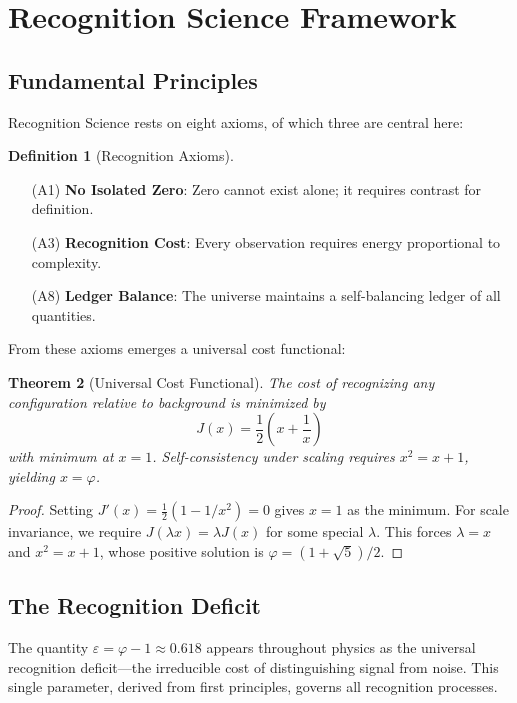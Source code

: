 \documentclass[11pt]{article}
\theoremstyle{plain}
\newtheorem{theorem}{Theorem}[section]
\theoremstyle{definition}
\newtheorem{definition}[theorem]{Definition}
\theoremstyle{remark}
\begin{document}
\section{Recognition Science Framework}

\subsection{Fundamental Principles}

Recognition Science rests on eight axioms, of which three are central here:

\begin{definition}[Recognition Axioms]
\begin{enumerate}
\item[(A1)] \textbf{No Isolated Zero}: Zero cannot exist alone; it requires contrast for definition.
\item[(A3)] \textbf{Recognition Cost}: Every observation requires energy proportional to complexity.
\item[(A8)] \textbf{Ledger Balance}: The universe maintains a self-balancing ledger of all quantities.
\end{enumerate}
\end{definition}

From these axioms emerges a universal cost functional:

\begin{theorem}[Universal Cost Functional]
The cost of recognizing any configuration relative to background is minimized by
\[
J(x) = \frac{1}{2}\left(x + \frac{1}{x}\right)
\]
with minimum at $x = 1$. Self-consistency under scaling requires $x^2 = x + 1$, yielding $x = \varphi$.
\end{theorem}

\begin{proof}
Setting $J'(x) = \frac{1}{2}(1 - 1/x^2) = 0$ gives $x = 1$ as the minimum. For scale invariance, we require $J(\lambda x) = \lambda J(x)$ for some special $\lambda$. This forces $\lambda = x$ and $x^2 = x + 1$, whose positive solution is $\varphi = (1+\sqrt{5})/2$.
\end{proof}

\subsection{The Recognition Deficit}

The quantity $\varepsilon = \varphi - 1 \approx 0.618$ appears throughout physics as the universal recognition deficit—the irreducible cost of distinguishing signal from noise. This single parameter, derived from first principles, governs all recognition processes.
\end{document}
